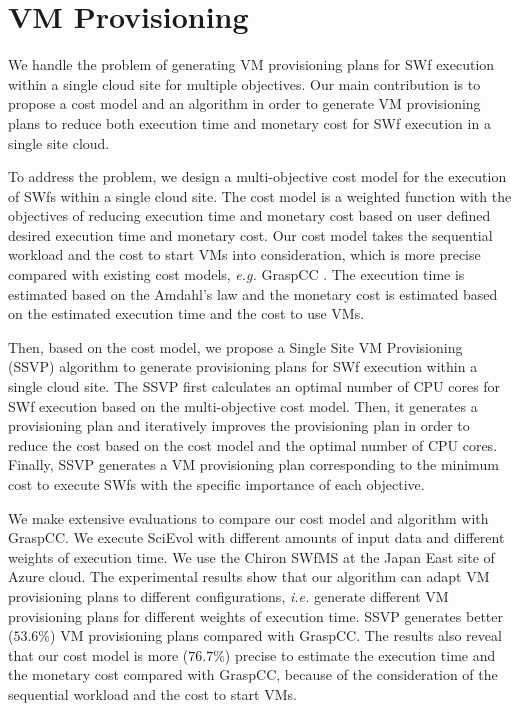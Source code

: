 \section*{VM Provisioning}
We handle the problem of generating VM provisioning plans for SWf execution within a single cloud site for multiple objectives. Our main contribution is to propose a cost model and an algorithm in order to generate VM provisioning plans to reduce both execution time and monetary cost for SWf execution in a single site cloud.

To address the problem, we design a multi-objective cost model for the execution of SWfs within a single cloud site. The cost model is a weighted function with the objectives of reducing execution time and monetary cost based on user defined desired execution time and monetary cost. Our cost model takes the sequential workload and the cost to start VMs into consideration, which is more precise compared with existing cost models, \textit{e.g.} GraspCC \cite{Coutinho2014}. The execution time is estimated based on the Amdahl's law \cite{Sun2013} and the monetary cost is estimated based on the estimated execution time and the cost to use VMs. 

Then, based on the cost model, we propose a Single Site VM Provisioning (SSVP) algorithm to generate provisioning plans for SWf execution within a single cloud site. The SSVP first calculates an optimal number of CPU cores for SWf execution based on the multi-objective cost model. Then, it generates a provisioning plan and iteratively improves the provisioning plan in order to reduce the cost based on the cost model and the optimal number of CPU cores. Finally, SSVP generates a VM provisioning plan corresponding to the minimum cost to execute SWfs with the specific importance of each objective.

We make extensive evaluations to compare our cost model and algorithm with GraspCC. We execute SciEvol with different amounts of input data and different weights of execution time. We use the Chiron SWfMS at the Japan East site of Azure cloud. The experimental results show that our algorithm can adapt VM provisioning plans to different configurations, \textit{i.e.} generate different VM provisioning plans for different weights of execution time. SSVP generates better ($53.6\%$) VM provisioning plans compared with GraspCC. The results also reveal that our cost model is more ($76.7\%$) precise to estimate the execution time and the monetary cost compared with GraspCC, because of the consideration of the sequential workload and the cost to start VMs.

